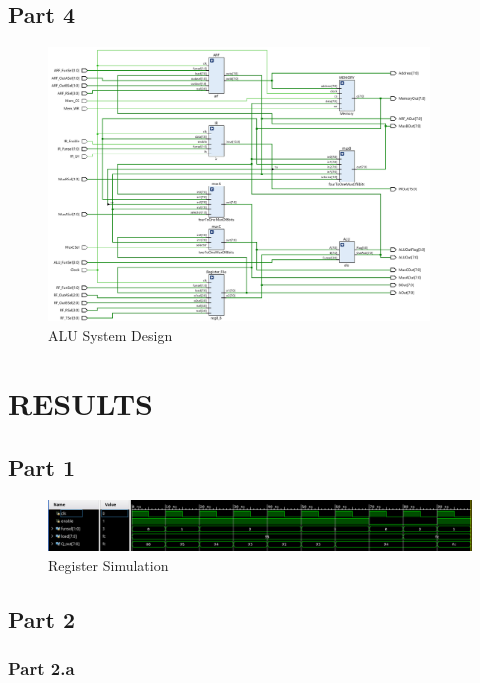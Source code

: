 \documentclass[pdftex,12pt,a4paper]{article}
\begin{document}
\subsection{Part 4}
    \begin{figure}[H]
    	\centering
    	\includegraphics[width=0.9\textwidth]{design/ALU_system.png}	
    	\caption{ALU System Design}
    	\label{ALU System Design}
    \end{figure}








\section{RESULTS}


\subsection{Part 1}

\begin{figure}[H]
	\centering
	\includegraphics[width=1\textwidth]{results/register.png}	
	\caption{Register Simulation}
	\label{Register Simulation}
\end{figure}

\subsection{Part 2}
\subsubsection{Part 2.a}
\end{document}
